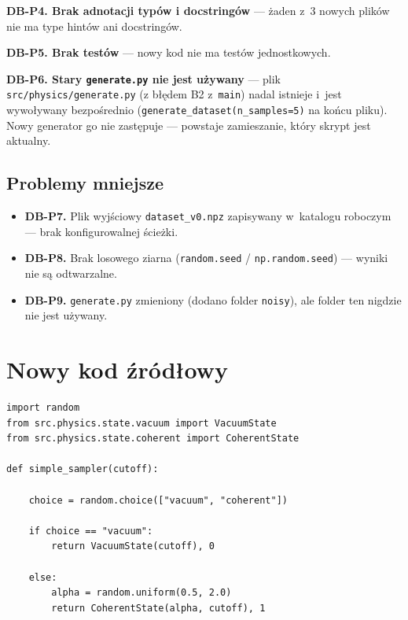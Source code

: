 \documentclass[12pt,a4paper]{article}
\begin{document}
\textbf{DB-P4. Brak adnotacji typów i docstringów} --- żaden z~3 nowych plików nie ma type hintów ani docstringów.

\textbf{DB-P5. Brak testów} --- nowy kod nie ma testów jednostkowych.

\textbf{DB-P6. Stary \texttt{generate.py} nie jest używany} --- plik \texttt{src/physics/generate.py} (z błędem B2 z~\texttt{main}) nadal istnieje i~jest wywoływany bezpośrednio (\texttt{generate\_dataset(n\_samples=5)} na końcu pliku). Nowy generator go nie zastępuje --- powstaje zamieszanie, który skrypt jest aktualny.

\subsection{Problemy mniejsze}

\begin{itemize}
    \item \textbf{DB-P7.} Plik wyjściowy \texttt{dataset\_v0.npz} zapisywany w~katalogu roboczym --- brak konfigurowalnej ścieżki.
    \item \textbf{DB-P8.} Brak losowego ziarna (\texttt{random.seed} / \texttt{np.random.seed}) --- wyniki nie są odtwarzalne.
    \item \textbf{DB-P9.} \texttt{generate.py} zmieniony (dodano folder \texttt{noisy}), ale folder ten nigdzie nie jest używany.
\end{itemize}

\section{Nowy kod źródłowy}

\begin{lstlisting}[caption={\texttt{src/dataset/state\_sampler.py} --- sampler losujący stany.}, label={lst:sampler}]
import random
from src.physics.state.vacuum import VacuumState
from src.physics.state.coherent import CoherentState

def simple_sampler(cutoff):

    choice = random.choice(["vacuum", "coherent"])

    if choice == "vacuum":
        return VacuumState(cutoff), 0

    else:
        alpha = random.uniform(0.5, 2.0)
        return CoherentState(alpha, cutoff), 1
\end{lstlisting}
\end{document}
